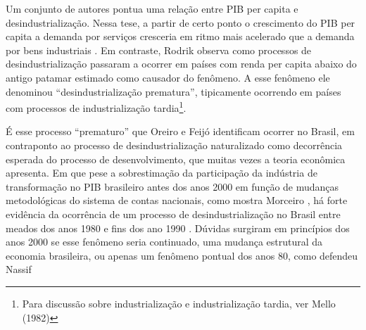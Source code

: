 {Um conjunto de autores pontua uma relação entre PIB per capita e
desindustrialização. Nessa tese, a partir de certo ponto o crescimento
do PIB per capita a demanda por serviços cresceria em ritmo mais
acelerado que a demanda por bens industriais
\citep{rodrik_premature_2016}. Em
contraste, Rodrik
\citet{rodrik_premature_2016} observa como
processos de desindustrialização passaram a ocorrer em países com renda
per capita abaixo do antigo patamar estimado como causador do fenômeno.
A esse fenômeno ele denominou ``desindustrialização prematura'',
tipicamente ocorrendo em países com processos de industrialização
tardia\footnote{Para discussão sobre industrialização e industrialização
  tardia, ver Mello (1982)}.

É esse processo ``prematuro'' que Oreiro e Feijó
\citet{oreiro_desindustrializacao_2010} identificam
ocorrer no Brasil, em contraponto ao processo de desindustrialização
naturalizado como decorrência esperada do processo de desenvolvimento,
que muitas vezes a teoria econômica apresenta. Em que pese a
sobrestimação da participação da indústria de transformação no PIB
brasileiro antes dos anos 2000 em função de mudanças metodológicas do
sistema de contas nacionais, como mostra Morceiro
\citet{morceiro2021}, há forte
evidência da ocorrência de um processo de desindustrialização no Brasil
entre meados dos anos 1980 e fins dos ano 1990
\citep{oreiromarconi2012}. Dúvidas surgiram em princípios dos anos 2000 se esse fenômeno
seria continuado, uma mudança estrutural da economia brasileira, ou
apenas um fenômeno pontual dos anos 80, como defendeu Nassif
\citep{nassif_ha_2008} \aiflag{(Nassif, 2015) %
Entretanto, evidências mais recentes apontam solidez do processo de
desindustrialização ao longo das duas primeiras décadas do século XXI,
como pode ser visto em Morceiro e Guilhoto
\citet{morceiro_adensamento_2020}, Maia
\citet{maia_ha_2020} e Feijó,
Lamônica e Lima
\citet{feijo_financial_2019}.

No caso do Rio de Janeiro o processo de desindustrialização está também
ligado a características próprias do estado. Sobral
\citet{sobral2016} aponta
relações de um ``vazio'' produtivo na região metropolitana com uma
concentração da atividade econômica em torno da metrópole. Em outro
artigo, o mesmo autor aponta as consequências econômicas negativas desse
processo de reestruturação econômica do estado, já perceptíveis no
início dos anos 2000
\citep{sobral2017}.
Compartilhando a preocupação com a concentração e desigualdade econômica
vista da perspectiva espacial, Vianna da Cruz
\citet{vianna_da_cruz_os_2013} discute os
impactos da problemática industrial para o desenvolvimento do estado e
da excessiva dependência deste no setor petrolífero. No quesito emprego,
Souza e Veríssimo
\citet{souza_producao_2019} apontam que,
ao menos até meados dos anos de 2010, se melhor que o cenário nacional,
o Rio de Janeiro já enfrentava decréscimo de cerca de 3,23\% do emprego
industrial na participação do emprego total -- saindo de 13,2\% em 1996
para 10,22\% em 2014, portanto, quase ¼ da participação no estoque de
emprego.

}}
